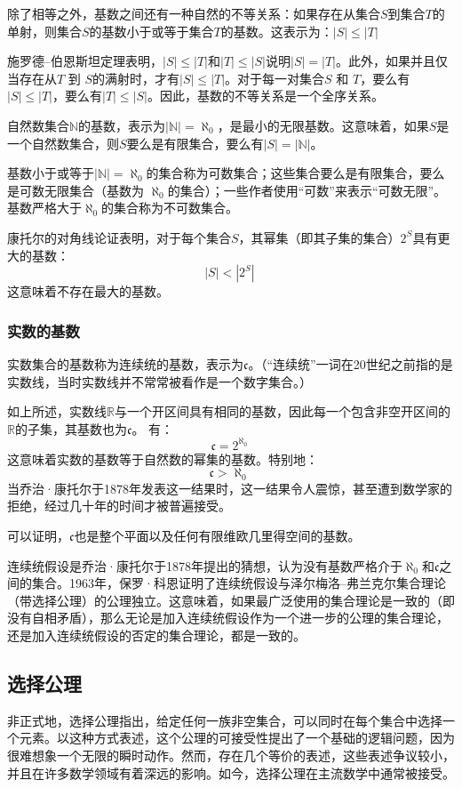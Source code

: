 除了相等之外，基数之间还有一种自然的不等关系：如果存在从集合\( S \)到集合\( T \)的单射，则集合\( S \)的基数小于或等于集合\( T \)的基数。这表示为：\(|S| \leq |T|\)

施罗德–伯恩斯坦定理表明，\( |S| \leq |T| \)和\( |T| \leq |S| \)说明\( |S| = |T| \)。此外，如果并且仅当存在从\( T \) 到 \( S \)的满射时，才有\( |S| \leq |T| \)。对于每一对集合\( S \) 和 \( T \)，要么有\( |S| \leq |T| \)，要么有\( |T| \leq |S| \)。因此，基数的不等关系是一个全序关系。

自然数集合\( \mathbb{N} \)的基数，表示为\( |\mathbb{N}| = \aleph_0 \)，是最小的无限基数。这意味着，如果\( S \)是一个自然数集合，则\( S \)要么是有限集合，要么有\( |S| = |\mathbb{N}| \)。

基数小于或等于\( |\mathbb{N}| = \aleph_0 \)的集合称为可数集合；这些集合要么是有限集合，要么是可数无限集合（基数为 \( \aleph_0 \)的集合）；一些作者使用“可数”来表示“可数无限”。基数严格大于\( \aleph_0 \)的集合称为不可数集合。

康托尔的对角线论证表明，对于每个集合\( S \)，其幂集（即其子集的集合）\( 2^S \)具有更大的基数：
\[
|S| < |2^S|~
\]
这意味着不存在最大的基数。
\subsubsection{实数的基数}
实数集合的基数称为连续统的基数，表示为\( \mathfrak{c} \)。（“连续统”一词在20世纪之前指的是实数线，当时实数线并不常常被看作是一个数字集合。）

如上所述，实数线\( \mathbb{R} \)与一个开区间具有相同的基数，因此每一个包含非空开区间的\( \mathbb{R} \)的子集，其基数也为\( \mathfrak{c} \)。
有：
\[
\mathfrak{c} = 2^{\aleph_0}~
\]
这意味着实数的基数等于自然数的幂集的基数。特别地：
\[
\mathfrak{c} > \aleph_0~
\]
当乔治·康托尔于1878年发表这一结果时，这一结果令人震惊，甚至遭到数学家的拒绝，经过几十年的时间才被普遍接受。

可以证明，\( \mathfrak{c} \)也是整个平面以及任何有限维欧几里得空间的基数。

连续统假设是乔治·康托尔于1878年提出的猜想，认为没有基数严格介于\( \aleph_0 \)和\( \mathfrak{c} \)之间的集合。1963年，保罗·科恩证明了连续统假设与泽尔梅洛–弗兰克尔集合理论（带选择公理）的公理独立。这意味着，如果最广泛使用的集合理论是一致的（即没有自相矛盾），那么无论是加入连续统假设作为一个进一步的公理的集合理论，还是加入连续统假设的否定的集合理论，都是一致的。
\subsection{选择公理}
非正式地，选择公理指出，给定任何一族非空集合，可以同时在每个集合中选择一个元素。以这种方式表述，这个公理的可接受性提出了一个基础的逻辑问题，因为很难想象一个无限的瞬时动作。然而，存在几个等价的表述，这些表述争议较小，并且在许多数学领域有着深远的影响。如今，选择公理在主流数学中通常被接受。

